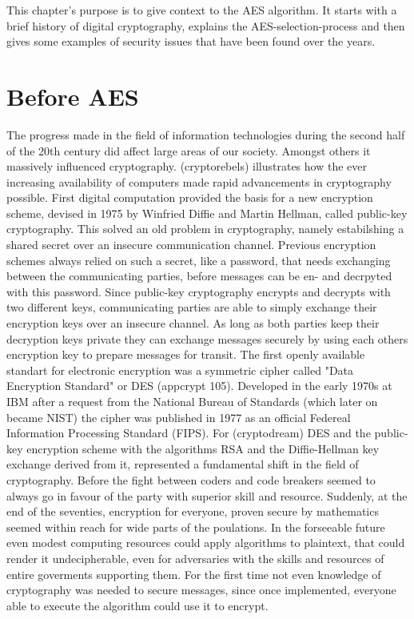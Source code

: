 This chapter's purpose is to give context to the AES algorithm. It starts with a brief history of digital cryptography, explains the AES-selection-process and then gives some examples of security issues that have been found over the years.


\section{Before AES}
\label{ch:before-aes}
The progress made in the field of information technologies during the second half of the 20th century did affect large areas of our society. Amongst others it massively influenced cryptography. (cryptorebels) illustrates how the ever increasing availability of computers made rapid advancements in cryptography possible. First digital computation provided the basis for a new encryption scheme, devised in 1975 by Winfried Diffie and Martin Hellman, called public-key cryptography. This solved an old problem in cryptography, namely estabilshing a shared secret over an insecure communication channel. Previous encryption schemes always relied on such a secret, like a password, that needs exchanging between the communicating parties, before messages can be en- and decrpyted with this password. Since public-key cryptography encrypts and decrypts with two different keys, communicating parties are able to simply exchange their encryption keys over an insecure channel. As long as both parties keep their decryption keys private they can exchange messages securely by using each others encryption key to prepare messages for transit.
The first openly available standart for electronic encryption was a symmetric cipher called "Data Encryption Standard" or DES (appcrypt 105). Developed in the early 1970s at IBM after a request from the National Bureau of Standards (which later on became NIST) the cipher was published in 1977 as an official Federeal Information Processing Standard (FIPS). For (cryptodream) DES and the public-key encryption scheme with the algorithms RSA and the Diffie-Hellman key exchange derived from it, represented a fundamental shift in the field of cryptography. Before the fight between coders and code breakers seemed to always go in favour of the party with superior skill and resource. Suddenly, at the end of the seventies, encryption for everyone, proven secure by mathematics seemed within reach for wide parts of the poulations. In the forseeable future even modest computing resources could apply algorithms to plaintext, that could render it undecipherable, even for adversaries with the skills and resources of entire goverments supporting them. For the first time not even knowledge of cryptography was needed to secure messages, since once implemented, everyone able to execute the algorithm could use it to encrypt.
